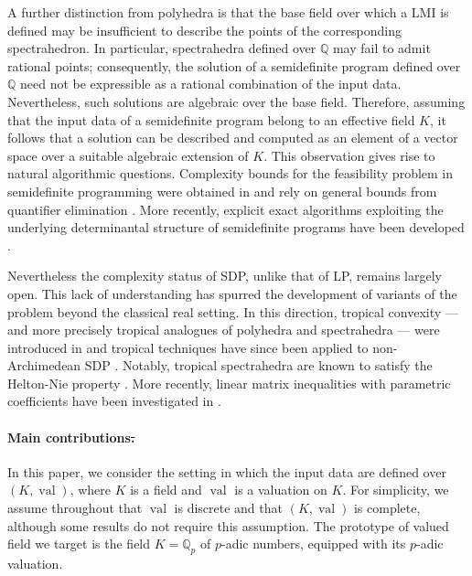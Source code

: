 \documentclass{elsarticle}
\theoremstyle{plain}
\theoremstyle{definition}
\DeclareMathOperator{\val}{val}
\def\QQ{\ensuremath{\mathbb{Q}}}
\providecommand{\DIFdeltex}[1]{{\protect\color{red}\sout{#1}}}                      %
\providecommand{\DIFdelbegin}{} %
\providecommand{\DIFdelend}{} %
\providecommand{\DIFdel}[1]{\texorpdfstring{\DIFdeltex{#1}}{}} %
\begin{document}
A further distinction from polyhedra is that the base field over which a LMI is defined may be insufficient to describe the points of the corresponding spectrahedron. In particular, spectrahedra defined over $\QQ$ may fail to admit rational points; consequently, the solution of a semidefinite program defined over $\QQ$ need not be expressible as a rational combination of the input data. Nevertheless, such solutions are algebraic over the base field. Therefore, assuming that the input data of a semidefinite program belong to an effective field $K$, it follows that a solution can be described and computed as an element of a vector space over a suitable algebraic extension of $K$. This observation gives rise to natural algorithmic questions. Complexity bounds for the feasibility problem in semidefinite programming were obtained in \cite{porkolab1997complexity} and rely on general bounds from quantifier elimination \cite{renegar1992computational}. More recently, explicit exact algorithms exploiting the underlying determinantal structure of semidefinite programs have been developed \cite{henrion2016exact,NALDI2018206}.

Nevertheless the complexity status of SDP, unlike that of LP, remains largely
open. This lack of understanding has spurred the development of variants of the problem beyond the classical 
real setting.
In this direction, tropical convexity --- and more precisely tropical analogues of polyhedra and spectrahedra ---
were introduced in \cite{develin2004tropical,allamigeon_tropical_2020} and tropical techniques have since been applied to
non-Archimedean SDP \cite{allamigeon2016solving}. Notably, tropical spectrahedra are known to satisfy
the Helton-Nie property \cite{allamigeon2019tropical}. More recently, linear matrix inequalities with parametric coefficients
have been investigated in \cite{naldi2025solving}.

\paragraph{Main contributions\DIFdelbegin \DIFdel{.}\DIFdelend }
In this paper, we consider the setting in which the input data are defined over $(K,\val)$,
where $K$ is a field and
$\val$ is a valuation on $K$. For simplicity, we assume throughout that $\val$ is discrete and that $(K,\val)$ is complete, although some results do not require this assumption. The prototype of valued field we target is the field $K=\QQ_p$ of $p$-adic numbers, equipped with its $p$-adic valuation.
\end{document}
